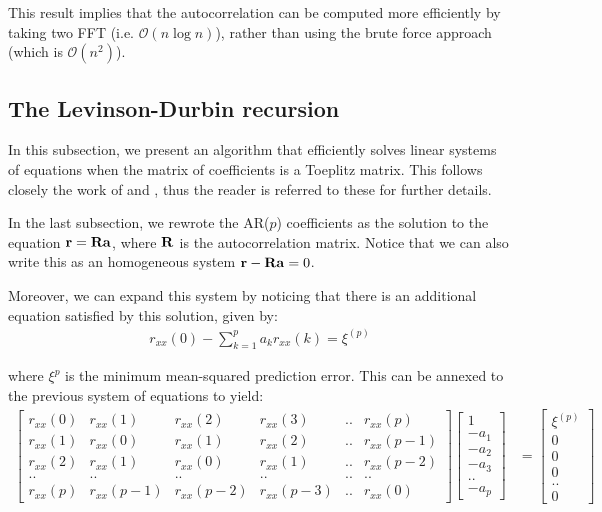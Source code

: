 \documentclass[../main.tex]{subfiles}
\begin{document}
\par This result implies that the autocorrelation can be computed more efficiently by taking two FFT (i.e. $\mathcal{O}(n\log{n})$), rather than using the brute force approach (which is $\mathcal{O}(n^2)$).

\subsection{The Levinson-Durbin recursion} \label{subsection_levinson}
In this subsection, we present an algorithm that efficiently solves linear systems of equations when the matrix of coefficients is a Toeplitz matrix. This follows closely the work of \cite{Oppenheim2010} and \cite{Collomb2009}, thus the reader is referred to these for further details.
\par In the last subsection, we rewrote the AR($p$) coefficients as the solution to the equation $\mathbf{r} = \mathbf{Ra}$, where $\mathbf{R}$ is the autocorrelation matrix. Notice that we can also write this as an homogeneous system $\mathbf{r-Ra} = 0$. 
\par Moreover, we can expand this system by noticing that there is an additional equation satisfied by this solution, given by:
\begin{align*}
r_{xx}(0) - \sum_{k=1}^p{a_kr_{xx}(k)} = \xi^{(p)}
\end{align*}
\par where $\xi^p$ is the minimum mean-squared prediction error. This can be annexed to the previous system of equations to yield:
\begin{align*}
\begin{bmatrix} r_{xx}(0) & r_{xx}(1) & r_{xx}(2) & r_{xx}(3) & .. & r_{xx}(p) \\ r_{xx}(1) & r_{xx}(0) & r_{xx}(1) & r_{xx}(2) & .. & r_{xx}(p-1) \\ r_{xx}(2) & r_{xx}(1) & r_{xx}(0) & r_{xx}(1) & .. & r_{xx}(p-2) \\ .. & .. & .. & .. & ..  & .. \\ r_{xx}(p) & r_{xx}(p-1) & r_{xx}(p-2) & r_{xx}(p-3) & .. & r_{xx}(0) \end{bmatrix} \left[ \begin{array}{c} 1\\ -a_1 \\ -a_2 \\ -a_3 \\ .. \\ -a_p \end{array} \right] &= \left[ \begin{array}{c} \xi^{(p)} \\ 0 \\ 0 \\ 0 \\ .. \\ 0  \end{array} \right]
\end{align*}
\end{document}
